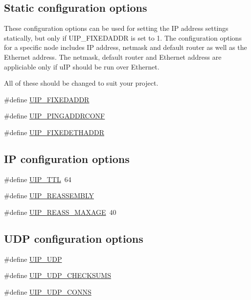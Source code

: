 \subsection*{Static configuration options}
\label{_amgrp8ef70bf271b77f0d95af49484e8e0317}
 These configuration options can be used for setting the IP address settings statically, but only if UIP\_\-FIXEDADDR is set to 1. The configuration options for a specific node includes IP address, netmask and default router as well as the Ethernet address. The netmask, default router and Ethernet address are appliciable only if uIP should be run over Ethernet.

All of these should be changed to suit your project. \begin{DoxyCompactItemize}
\item 
\#define \hyperlink{group__uipopt_ga51195ea7cd5aa387a87f9d3b23905b62}{UIP\_\-FIXEDADDR}
\item 
\#define \hyperlink{group__uipopt_ga9069474ea570fd78c481aa164317dbaf}{UIP\_\-PINGADDRCONF}
\item 
\#define \hyperlink{group__uipopt_gae0f8cbeca9731af2171ffd37e79de893}{UIP\_\-FIXEDETHADDR}
\end{DoxyCompactItemize}
\subsection*{IP configuration options}
\label{_amgrp72aedc455a3ab41b5ab6a73fe8775b4e}
 \begin{DoxyCompactItemize}
\item 
\#define \hyperlink{group__uipopt_gab61381673de27f31848c5396bf0b338e}{UIP\_\-TTL}~64
\item 
\#define \hyperlink{group__uipopt_gaf963fdea2b75d27ef31e92d1d01359ee}{UIP\_\-REASSEMBLY}
\item 
\#define \hyperlink{group__uipopt_gac3882366feda1cb759ccbfe98327a7db}{UIP\_\-REASS\_\-MAXAGE}~40
\end{DoxyCompactItemize}
\subsection*{UDP configuration options}
\label{_amgrp426a17bfcee307b47aecb388765b96af}
 \begin{DoxyCompactItemize}
\item 
\#define \hyperlink{group__uipopt_gadcf372ff9748996f7c05e9822a615384}{UIP\_\-UDP}
\item 
\#define \hyperlink{group__uipopt_ga92f3344ec8ca46893163399c89fafed5}{UIP\_\-UDP\_\-CHECKSUMS}
\item 
\#define \hyperlink{group__uipopt_ga196379ceb1219a99f4495e41ccc9bbfb}{UIP\_\-UDP\_\-CONNS}
\end{DoxyCompactItemize}
